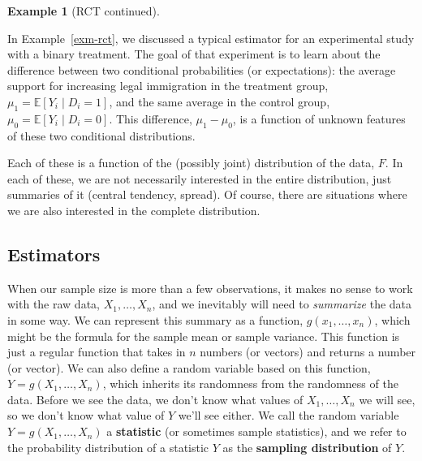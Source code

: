\documentclass[
  letterpaper,
  DIV=11,
  numbers=noendperiod]{scrreprt}
\newcommand{\E}{\mathbb{E}}
\theoremstyle{definition}
\theoremstyle{plain}
\theoremstyle{definition}
\newtheorem{example}{Example}[chapter]
\theoremstyle{remark}
\begin{document}
\leavevmode{}%
\begin{example}[RCT continued]\label{exm-rct-ii}

In Example~\ref{exm-rct}, we discussed a typical estimator for an
experimental study with a binary treatment. The goal of that experiment
is to learn about the difference between two conditional probabilities
(or expectations): the average support for increasing legal immigration
in the treatment group, \(\mu_1 = \E[Y_i \mid D_i = 1]\), and the same
average in the control group, \(\mu_0 = \E[Y_i \mid D_i = 0]\). This
difference, \(\mu_1 - \mu_0\), is a function of unknown features of
these two conditional distributions.

\end{example}

Each of these is a function of the (possibly joint) distribution of the
data, \(F\). In each of these, we are not necessarily interested in the
entire distribution, just summaries of it (central tendency, spread). Of
course, there are situations where we are also interested in the
complete distribution.

\hypertarget{estimators}{%
\subsection{Estimators}\label{estimators}}

When our sample size is more than a few observations, it makes no sense
to work with the raw data, \(X_1, \ldots, X_n\), and we inevitably will
need to \emph{summarize} the data in some way. We can represent this
summary as a function, \(g(x_1, \ldots, x_n)\), which might be the
formula for the sample mean or sample variance. This function is just a
regular function that takes in \(n\) numbers (or vectors) and returns a
number (or vector). We can also define a random variable based on this
function, \(Y = g(X_1, \ldots, X_n)\), which inherits its randomness
from the randomness of the data. Before we see the data, we don't know
what values of \(X_1, \ldots, X_n\) we will see, so we don't know what
value of \(Y\) we'll see either. We call the random variable
\(Y = g(X_1, \ldots, X_n)\) a \textbf{statistic} (or sometimes sample
statistics), and we refer to the probability distribution of a statistic
\(Y\) as the \textbf{sampling distribution} of \(Y\).
\end{document}
